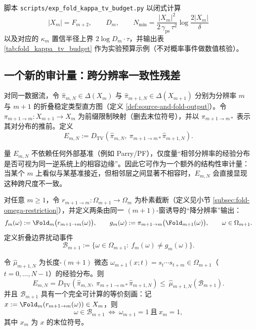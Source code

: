 \begin{remark}\label{rem:fold-kappa-tv-budget-repro}
脚本 \texttt{scripts/exp\_fold\_kappa\_tv\_budget.py} 以闭式计算
\[
|X_m|=F_{m+2},\qquad D_m,\qquad
N_{\min}=\frac{|X_m|^{2}}{2\,\gamma_{\mathrm{ps}}\,\tau^{2}}\log\frac{2|X_m|}{\delta}
\]
以及对应的 \(\kappa_m\) 置信半径上界 \(2\log D_m\cdot\tau\)，并输出表 \ref{tab:fold_kappa_tv_budget} 作为实验预算示例（不对概率事件做数值核验）。

\end{remark}

\subsection{一个新的审计量：跨分辨率一致性残差}\label{subsec:multiscale-residual}

\begin{definition}[跨分辨率一致性残差]\label{def:multiscale-residual}
对同一数据流，令 \(\hat{\pi}_{m,N}\in\Delta(X_m)\) 与 \(\hat{\pi}_{m+1,N}\in\Delta(X_{m+1})\) 分别为分辨率 \(m\) 与 \(m+1\) 的折叠稳定类型直方图（定义 \ref{def:source-and-fold-output}）。令 \(\pi_{m+1\to m}:X_{m+1}\to X_m\) 为前缀限制映射（删去末位符号），并以 \(\pi_{m+1\to m*}\) 表示其对分布的推前。定义
\[
E_{m,N}
:=
D_{\mathrm{TV}}\!\left(\hat{\pi}_{m,N},\ \pi_{m+1\to m*}\hat{\pi}_{m+1,N}\right).
\]
\end{definition}

\begin{remark}[语义与可判读性]
量 \(E_{m,N}\) 不依赖任何外部基准（例如 Parry/PF），仅度量“相邻分辨率的经验分布是否可视为同一逆系统上的相容边缘”。因此它可作为一个额外的结构性审计量：当某个 \(m\) 上看似与某基准接近，但相邻层之间显著不相容时，\(E_{m,N}\) 会直接显现这种跨尺度不一致。
\end{remark}

\begin{definition}[折叠边界扰动事件]\label{def:fold-boundary-event}
对任意 $m\ge 1$，令 $r_{m+1\to m}:\Omega_{m+1}\to\Omega_m$ 为朴素截断（定义见小节 \ref{subsec:fold-omega-restriction}），并定义两条由同一 $(m{+}1)$-窗诱导的“降分辨率”输出：
\[
f_m(\omega):=\Fold_m\bigl(r_{m+1\to m}(\omega)\bigr),\qquad
g_m(\omega):=\pi_{m+1\to m}\bigl(\Fold_{m+1}(\omega)\bigr),\qquad \omega\in\Omega_{m+1}.
\]
定义折叠边界扰动事件
\[
\mathcal{B}_{m+1}:=\{\omega\in\Omega_{m+1}:\ f_m(\omega)\ne g_m(\omega)\}.
\]
\end{definition}

\begin{proposition}\label{prop:multiscale-residual-by-boundary}
令 $\hat\mu_{m+1,N}$ 为长度-$(m{+}1)$ 微态 $\omega_{m+1}(x;t)=s_t\cdots s_{t+m}\in\Omega_{m+1}$（$t=0,\dots,N-1$）的经验分布。则
\[
E_{m,N}
=D_{\mathrm{TV}}\!\left(\hat\pi_{m,N},\ \pi_{m+1\to m*}\hat\pi_{m+1,N}\right)
\le\ \hat\mu_{m+1,N}(\mathcal{B}_{m+1}).
\]
并且 $\mathcal{B}_{m+1}$ 具有一个完全可计算的等价刻画：记 $x:=\Fold_m(r_{m+1\to m}(\omega))\in X_m$，则
\[
\omega\in\mathcal{B}_{m+1}\ \Longleftrightarrow\ \omega_{m+1}=1\ \text{且}\ x_m=1,
\]
其中 $x_m$ 为 $x$ 的末位符号。
\end{proposition}

